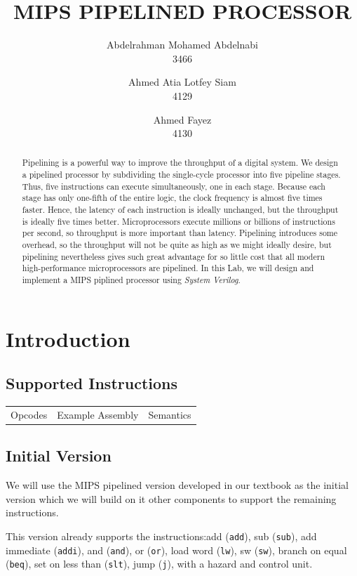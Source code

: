\documentclass[titlepage,12pt,oneside,a4paper]{article}
\title{MIPS PIPELINED PROCESSOR}
\author{
	Abdelrahman Mohamed Abdelnabi\\
	3466
	\and
	Ahmed Atia Lotfey Siam \\
	4129
	\and
	Ahmed Fayez \\
	4130
}
\newcommand{\code}[1]{{\texttt{#1}}}
\begin{document}
\maketitle

\begin{abstract}
	Pipelining is a powerful way to improve the	throughput of a digital system. We design a pipelined processor by subdividing the single-cycle processor into five pipeline stages. Thus, five instructions can execute simultaneously, one in each stage. Because each stage has only one-fifth of the entire logic, the clock frequency is almost five times faster. Hence, the latency of each instruction is ideally unchanged, but the throughput is ideally five times better. Microprocessors execute millions or billions of instructions per second, so throughput is more important than latency. Pipelining introduces some overhead, so the throughput will not be quite as high as we might ideally desire, but pipelining nevertheless gives such great advantage for so little cost that all modern high-performance microprocessors are pipelined. In this Lab, we will design and implement a MIPS piplined  processor using\textit{ System Verilog}.
\end{abstract}



\section{Introduction}
\subsection{Supported Instructions}
\begin{tabular}{ccc}
	\label{ISA}
	Opcodes & Example Assembly & Semantics \\
	
\end{tabular}

\subsection{Initial Version}
We will use the MIPS pipelined version developed in our textbook as the initial version which we will build on it other components to support the remaining instructions.

This version already supports the instructions:add (\code{add}), sub (\code{sub}), add immediate (\code{addi}), and (\code{and}), or (\code{or}), load word (\code{lw}), sw (\code{sw}), branch on equal (\code{beq}), set on less than (\code{slt}), jump (\code{j}), with a hazard and control unit.
\end{document}

